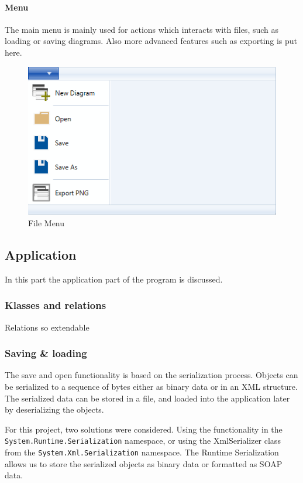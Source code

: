 \paragraph{Menu}
The main menu is mainly used for actions which interacts with files, such as
loading or saving diagrams. Also more advanced features such as exporting is put
here.

\begin{figure}[H]
\centering
\includegraphics[width=\linewidth]{"img/file menu"}
\caption{File Menu \label{menu}}
\end{figure}

\subsection{Application}
In this part the application part of the program is discussed.

\subsubsection{Klasses and relations}
Relations so extendable

\subsubsection{Saving \& loading}
The save and open functionality is based on the serialization process. Objects
can be serialized to a sequence of bytes either as binary data or in an XML
structure. The serialized data can be stored in a file, and loaded into the
application later by deserializing the objects.

For this project, two solutions were considered. Using the functionality in the
\texttt{System.Runtime.Serialization} namespace, or using the XmlSerializer
class from the \texttt{System.Xml.Serialization} namespace. The Runtime
Serialization allows us to store the serialized objects as binary data or
formatted as SOAP data.

